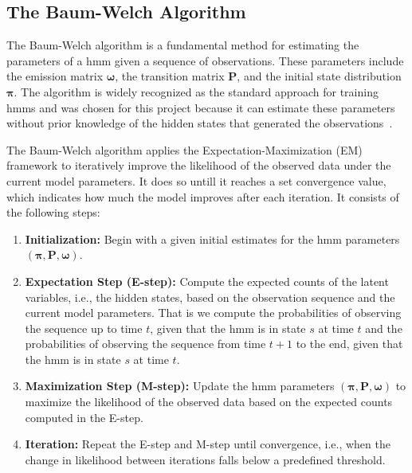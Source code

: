 

\subsection{The Baum-Welch Algorithm}\label{subsec:baum-welch}
The Baum-Welch algorithm is a fundamental method for estimating the parameters of a \gls{hmm} given a sequence of observations.
These parameters include the emission matrix $\pmb{\omega}$, the transition matrix $\pmb{P}$, and the initial state distribution $\pmb{\pi}$.
The algorithm is widely recognized as the standard approach for training \glspl{hmm} and was chosen for this project because it can estimate these parameters without prior knowledge of the hidden states that generated the observations~\cite{levinson1983introduction}.

The Baum-Welch algorithm applies the Expectation-Maximization (EM) framework to iteratively improve the likelihood of the observed data under the current model parameters. It does so untill it reaches a set convergence value, which indicates how much the model improves after each iteration.
It consists of the following steps:

\begin{enumerate}
    \item \textbf{Initialization:} Begin with a given initial estimates for the \gls{hmm} parameters $(\pmb{\pi}, \pmb{P}, \pmb{\omega})$.
    \item \textbf{Expectation Step (E-step):} Compute the expected counts of the latent variables, i.e., the hidden states, based on the observation sequence and the current model parameters.
    That is we compute the probabilities of observing the sequence up to time $t$, given that the \gls{hmm} is in state $s$ at time $t$ and the probabilities of observing the sequence from time $t+1$ to the end, given that the \gls{hmm} is in state $s$ at time $t$.
    \item \textbf{Maximization Step (M-step):} Update the \gls{hmm} parameters $(\pmb{\pi}, \pmb{P}, \pmb{\omega})$ to maximize the likelihood of the observed data based on the expected counts computed in the E-step.
    \item \textbf{Iteration:} Repeat the E-step and M-step until convergence, i.e., when the change in likelihood between iterations falls below a predefined threshold.
\end{enumerate}


